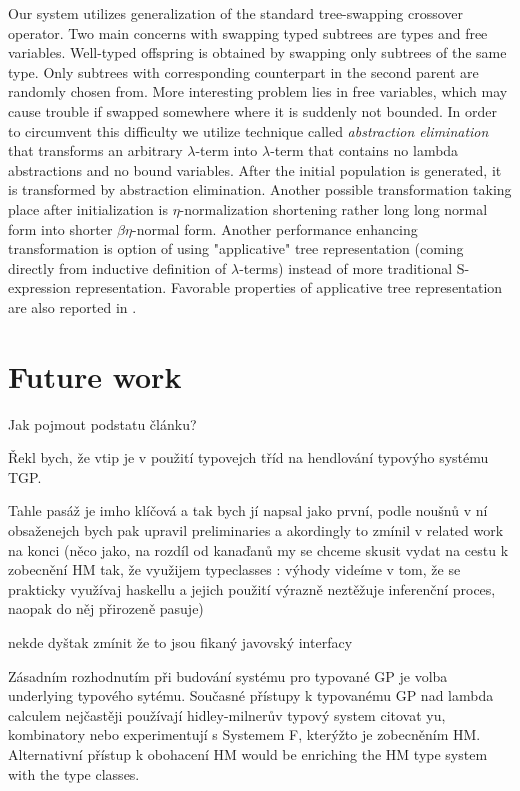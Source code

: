 \documentclass[11pt]{article}
\newcommand{\lterm}{$\lambda$-term\xspace}
\newcommand{\lterms}{$\lambda$-terms\xspace}
\newcommand{\red}[1]{{\color{red} #1}}
\begin{document}
\begin{article}
Our system utilizes generalization of the standard 
tree-swapping crossover operator. Two main concerns with swapping typed 
subtrees are types and free variables. Well-typed offspring is obtained 
by swapping only subtrees of the same type. Only subtrees with 
corresponding counterpart in the second parent are randomly chosen from.
More interesting problem lies in free variables, which may cause trouble
if swapped somewhere where it is suddenly not bounded. In order to circumvent this
difficulty we utilize technique called \textit{abstraction elimination}\citep{jones87}
that transforms an arbitrary \lterm into \lterm that contains no lambda abstractions
and no bound variables. After the initial population is generated,  it is transformed
by abstraction elimination. Another possible transformation taking place
after initialization is $\eta$-normalization shortening 
rather long long normal form into shorter $\beta\eta$-normal form.  
Another performance enhancing transformation is option of using "applicative" tree representation (coming directly from inductive definition of \lterms) instead of more traditional S-expression representation. Favorable properties of applicative tree representation are also reported in \citep{yu1998polygp}. 

\section{Future work}
\red{
Jak pojmout podstatu článku?

Řekl bych, že vtip je v použití typovejch tříd na hendlování typovýho systému TGP.

Tahle pasáž je imho klíčová a tak bych jí napsal jako první,
podle noušnů v ní obsaženejch bych pak upravil preliminaries
a akordingly to zmínil v related work na konci (něco jako, na rozdíl od 
kanaďanů my se chceme skusit vydat na cestu k zobecnění HM tak, že 
využijem typeclasses : výhody videíme v tom, že se prakticky využívaj 
haskellu a jejich použití výrazně neztěžuje inferenční proces, naopak do něj
přirozeně pasuje)
}
\red{nekde dyštak zmínit že to jsou fikaný javovský interfacy}


Zásadním rozhodnutím při budování systému pro typované GP je volba underlying typového sytému. Současné přístupy k typovanému GP nad lambda calculem nejčastěji používají hidley-milnerův typový system \red{citovat yu, kombinatory} nebo experimentují s Systemem F, kterýžto je zobecněním HM. Alternativní přístup k obohacení HM would be enriching the HM type system with the type classes.  


\end{article}
\end{document}
